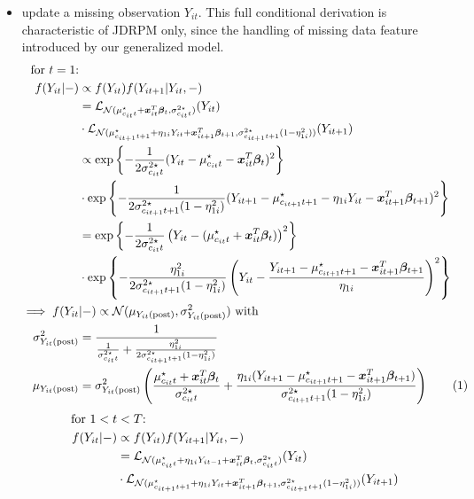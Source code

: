 \documentclass[12pt,	%
	a4paper,		%
	twoside,		%
	openright,		%
	titlepage,%
	]{book}
\theoremstyle{definition}
\begin{document}
\begin{itemize}
\item update a missing observation $Y_{it}$. This full conditional derivation is characteristic of JDRPM only, since the handling of missing data feature introduced by our generalized model.
\begin{align*}
\text{for $t=1$:}&\\ 
 f(Y_{it} |- ) & \propto  f(Y_{it})  f(Y_{it+1} | Y_{it}, - )\\
 & = \law_{\mathcal{N}(\mu^\star_{c_{it}t} + \vec{x}_{it}^T\vec{\beta}_t,\sigma^{2\star}_{c_{it}t})}(Y_{it}) \\& \cdot \law_{\mathcal{N}(\mu_{c_{it+1}t+1}^\star+\eta_{1i}Y_{it} + \vec{x}_{it+1}^T\vec{\beta}_{t+1},\sigma^{2\star}_{c_{it+1}t+1}(1-\eta_{1i}^2))}(Y_{it+1})\\
 & \propto \expp{-\frac{1}{2\sigma^{2\star}_{c_{it}t}}(Y_{it}-\mu^\star_{c_{it}t} - \vec{x}_{it}^T\vec{\beta}_t)^2} \\ & \cdot \expp{-\frac{1}{2\sigma^{2\star}_{c_{it+1}t+1}(1-\eta_{1i}^2)}(Y_{it+1}-\mu^\star_{c_{it+1}t+1} - \eta_{1i}Y_{it} - \vec{x}_{it+1}^T\vec{\beta}_{t+1})^2} \\ 
 & = \expp{-\frac{1}{2\sigma^{2\star}_{c_{it}t}}\left( Y_{it}-(\mu^\star_{c_{it}t} + \vec{x}_{it}^T\vec{\beta}_t) \right)^2} \\ & \cdot \expp{-\frac{\eta_{1i}^2}{2\sigma^{2\star}_{c_{it+1}t+1}(1-\eta_{1i}^2)}\left( Y_{it} - \frac{Y_{it+1}-\mu^\star_{c_{it+1}t+1} - \vec{x}_{it+1}^T\vec{\beta}_{t+1}}{\eta_{1i}}\right)^2} \\
%
 \implies f(Y_{it}&|-)\propto \text{$\N(\mu_{\postp{Y_{it}}},\sigma^2_{\postp{Y_{it}}})$ with}\\
\sigma^2_{\postp{Y_{it}}}&= \frac{1}{\frac{1}{\sigma^{2\star}_{c_{it}t}} + \frac{\eta_{1i}^2}{2\sigma^{2\star}_{c_{it+1}t+1}(1-\eta_{1i}^2)}}\\
\mu_{\postp{Y_{it}}}&=  \sigma^2_{\postp{Y_{it}}} \left( \frac{\mu^\star_{c_{it}t} + \vec{x}_{it}^T\vec{\beta}_t}{\sigma^{2\star}_{c_{it}t}} + \frac{\eta_{1i}(Y_{it+1}-\mu^\star_{c_{it+1}t+1} - \vec{x}_{it+1}^T\vec{\beta}_{t+1})}{\sigma^{2\star}_{c_{it+1}t+1}(1-\eta_{1i}^2)} \right)
\tag{\stepcounter{equation}\theequation}
\end{align*}
\begin{align*}
\text{for } 1<t&<T\text{:}\\
 f(Y_{it} |- ) & \propto  f(Y_{it})  f(Y_{it+1} | Y_{it}, - )\\
 & = \law_{\mathcal{N}(\mu^\star_{c_{it}t} + \eta_{1i}Y_{it-1} + \vec{x}_{it}^T\vec{\beta}_t,\sigma^{2\star}_{c_{it}t})}(Y_{it}) \\& \cdot \law_{\mathcal{N}(\mu_{c_{it+1}t+1}^\star+\eta_{1i}Y_{it} + \vec{x}_{it+1}^T\vec{\beta}_{t+1},\sigma^{2\star}_{c_{it+1}t+1}(1-\eta_{1i}^2))}(Y_{it+1})\\

\end{align*}
\end{itemize}
\end{document}
